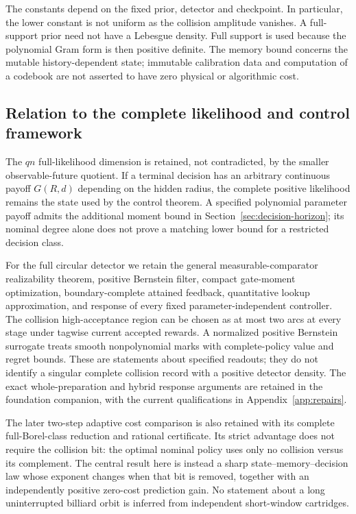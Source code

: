 The constants depend on the fixed prior, detector and checkpoint. In
particular, the lower constant is not uniform as the collision amplitude
vanishes. A full-support prior need not have a Lebesgue density. Full
support is used because the polynomial Gram form is then positive definite.
The memory bound concerns the mutable history-dependent state; immutable
calibration data and computation of a codebook are not asserted to have
zero physical or algorithmic cost.

\subsection{Relation to the complete likelihood and control framework}
The $qn$ full-likelihood dimension is retained, not contradicted, by the
smaller observable-future quotient. If a terminal decision has an arbitrary
continuous payoff $G(R,d)$ depending on the hidden radius, the complete
positive likelihood remains the state used by the control theorem. A
specified polynomial parameter payoff admits the additional moment bound
in Section~\ref{sec:decision-horizon}; its nominal degree alone does not
prove a matching lower bound for a restricted decision class.

For the full circular detector we retain the general measurable-comparator
realizability theorem, positive Bernstein filter, compact gate-moment
optimization, boundary-complete attained feedback, quantitative lookup
approximation, and response of every fixed parameter-independent controller.
The collision high-acceptance region can be chosen as at most two arcs at
every stage under tagwise current accepted rewards. A normalized positive
Bernstein surrogate treats smooth nonpolynomial marks with complete-policy
value and regret bounds. These are statements about specified readouts;
they do not identify a singular complete collision record with a positive
detector density. The exact whole-preparation and hybrid response arguments
are retained in the foundation companion, with the current qualifications
in Appendix~\ref{app:repairs}.

The later two-step adaptive cost comparison is also retained with its
complete full-Borel-class reduction and rational certificate. Its strict
advantage does not require the collision bit: the optimal nominal policy
uses only no collision versus its complement. The central result here is
instead a sharp state--memory--decision law whose exponent changes when
that bit is removed, together with an independently positive zero-cost
prediction gain. No statement about a long uninterrupted billiard orbit
is inferred from independent short-window cartridges.

